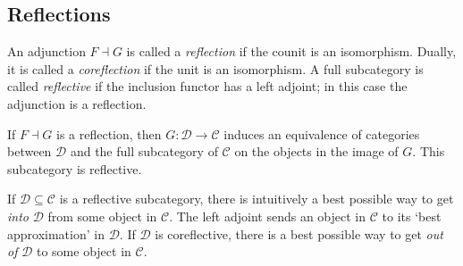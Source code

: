 \subsection{Reflections}
\begin{definition}
    An adjunction \( F \dashv G \) is called a \emph{reflection} if the counit is an isomorphism.
    Dually, it is called a \emph{coreflection} if the unit is an isomorphism.
    A full subcategory is called \emph{reflective} if the inclusion functor has a left adjoint; in this case the adjunction is a reflection.
\end{definition}
\begin{remark}
    If \( F \dashv G \) is a reflection, then \( G : \mathcal D \to \mathcal C \) induces an equivalence of categories between \( \mathcal D \) and the full subcategory of \( \mathcal C \) on the objects in the image of \( G \).
    This subcategory is reflective.
\end{remark}
If \( \mathcal D \subseteq \mathcal C \) is a reflective subcategory, there is intuitively a best possible way to get \emph{into} \( \mathcal D \) from some object in \( \mathcal C \).
The left adjoint sends an object in \( \mathcal C \) to its `best approximation' in \( \mathcal D \).
If \( \mathcal D \) is coreflective, there is a best possible way to get \emph{out of} \( \mathcal D \) to some object in \( \mathcal C \).
